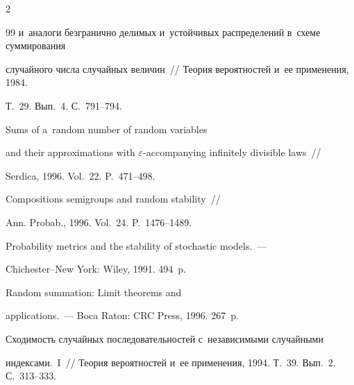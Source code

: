 \begin{multicols}{2}
{{\begin{thebibliography}{99}
и~аналоги безгранично делимых и~устойчивых распределений в~схеме суммирования 


случайного числа случайных величин~// Теория вероятностей и~ее применения, 1984. 


Т.~29. Вып.~4. С.~791--794.







 Sums of a~random number of random variables 


and their approximations with $\varepsilon$-accompanying infinitely divisible laws~// 


Serdica, 1996. Vol.~22. P.~471--498.







 Compositions semigroups and random stability~// 


Ann. Probab., 1996. Vol.~24. P.~1476--1489.












 Probability metrics and the stability of stochastic models.~--- 


 Chichester--New York: Wiley, 1991. 494~p.


 


 \pagebreak







 Random summation: Limit theorems and 


applications.~--- Boca Raton: CRC Press, 1996. 267~p.







 Сходимость случайных последовательностей с~независимыми случайными 


индексами.~I~// Теория вероятностей и~ее применения, 1994. Т.~39. Вып.~2. С.~313--333.






\end{thebibliography}}}
\end{multicols}
